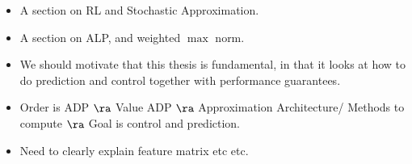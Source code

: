 \begin{itemize}
\item A section on RL and Stochastic Approximation.
\item A section on ALP, and weighted $\max$ norm.
\item We should motivate that this thesis is fundamental, in that it looks at how to do prediction and control together with performance guarantees.
\item Order is ADP $\ra$ Value ADP $\ra$ Approximation Architecture/ Methods to compute $\ra$ Goal is control and prediction.
\item Need to clearly explain feature matrix etc etc.
\end{itemize}
